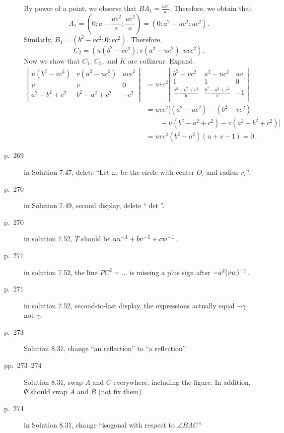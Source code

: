 \documentclass[11pt]{scrartcl}
\begin{document}
\begin{description}
  By power of a point, we observe that $BA_1 = \frac{uc^2}{a}$.
  Therefore, we obtain that
  \[ A_1 = \left( 0:a-\frac{uc^2}{a}: \frac{uc^2}{a} \right)
    = \left( 0:a^{2}-uc^2 : uc^2 \right). \]
  Similarly, $B_1 = \left( b^2-vc^2 : 0 : vc^2 \right)$.
  Therefore,
  \[ C_2 = \left( u(b^2-vc^2) : v(a^2-uc^2) : uvc^2 \right). \]
  Now we show that $C_1$, $C_2$, and $K$ are collinear.
  Expand
  \begin{align*}
  \left\lvert
  \begin{array}{ccc}
    u (b^2-vc^2) & v (a^2-uc^2) & uv c^2 \\
    u & v & 0 \\
    a^2-b^2+c^2 & b^2-a^2+c^2 & -c^2 \\
  \end{array}
  \right\rvert
  &= uvc^2 \left\lvert
  \begin{array}{ccc}
    b^2-vc^2 & a^2-uc^2 & uv \\
    1 & 1 & 0 \\
    \frac{a^2-b^2+c^2}{u} & \frac{b^2-a^2+c^2}{v} & -1 \\
  \end{array}
  \right\rvert \\
  &= uvc^2 \Big[ (a^2-uc^2)-(b^2-vc^2) \\
    &\qquad+ u(b^2-a^2+c^2) - v(a^2-b^2+c^2) \Big] \\
    &= uvc^2 (b^2-a^2)(u+v-1) = 0.
  \end{align*}
\item[p.\  269] in Solution 7.47, delete ``Let $\omega_i$ be the circle with center $O_i$ and radius $r_i$''.
\item[p.\  270] in Solution 7.49, second display, delete ``$\det$''.
\item[p.\  270] in solution 7.52, $T$ should be $au^{-1}+bv^{-1}+cw^{-1}$.
\item[p.\  271] in solution 7.52, the line $PC^2 = \dots$ is missing a plus sign after $-a^2(vw)^{-1}$.
\item[p.\  271] in solution 7.52, second-to-last display,
  the expressions actually equal $-\gamma$, not $\gamma$.
\item[p.\ 273] Solution 8.31, change ``an reflection'' to ``a reflection''.
\item[pp.\ 273--274] Solution 8.31, swap $A$ and $C$ everywhere, including the figure.
  In addition, $\Psi$ should swap $A$ and $B$ (not fix them).
\item[p.\  274] in Solution 8.31, change ``isogonal with respect to $\angle{BAC}$''

\end{description}
\end{document}

